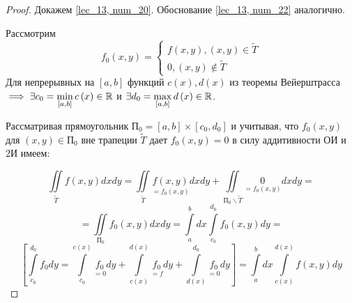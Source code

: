 \documentclass[../../main.tex]{subfiles}
\begin{document}
\begin{proof}
	Докажем \eqref {lec_13, num_20}. Обоснование \eqref {lec_13, num_22}
	аналогично.
	
	Рассмотрим 
	\[ 
	f_0 \left( x, y \right) =  
	\begin{cases}
	f \left( x, y \right),  \left( x, y \right) \in \widetilde{T} \\
	0, \left( x, y \right) \notin \widetilde{T}
	\end{cases}
	\]
	Для непрерывных на $ \left[ a, b \right] $ функций 
	$ c \left( x \right), d \left( x \right) $ из теоремы Вейерштрасса
	$ \implies \exists c_0 = 
	\min\limits_{\left[ a, b \right] } c \left( x \right) \in \mathbb{R} $ и 
	$ \exists d_0 = \max\limits_{\left[a, b \right] } d \left(x\right) \in \mathbb{R} $.
	
	Рассматривая прямоугольник $ \text{П}_0 = \left[ a, b \right] \times 
	\left[ c_0, d_0 \right]  $ и учитывая, что $ f_0 \left( x, y \right) $ для 
	$ \left( x, y \right) \in \text{П}_0 $ вне трапеции $\widetilde{T}$ дает
	$ f_0 \left( x, y \right) = 0 $ в силу аддитивности ОИ и 2И имеем:
	
	\[
	\iint\limits_{ \widetilde{T} } f \left( x, y \right) dx dy = 
	\iint\limits_{ \widetilde{T} } \underset{ = f_0 \left( x, y \right) } 
	{f \left( x, y \right)} dx dy + 
	\iint\limits_{ \text{П}_0 \smallsetminus \widetilde{T} } 
	\underset{ = f_0 \left( x, y \right) }  0 dx dy =
	\]
	\[
	= \iint\limits_{ \text{П}_0} f_0 \left( x, y \right) dx dy = 
	\int\limits_a^b dx
	\int\limits_{c_0}^{d_0} f_0 \left( x, y \right) dy = 
	\]
	\[
	\left[ \int\limits_{c_0}^{d_0} f_0 dy =
	 \int\limits_{c_0} ^ {c \left( x \right) } 
	\underset{ = 0} {f_0} dy + 
	\int\limits_{c \left( x \right) } ^ {d \left( x \right) } 
	\underset{ = f} {f_0} dy +
	 \int\limits_{d \left( x \right) } ^ {d_0} 
	\underset{ = 0} {f_0} dy \right] = 
	\int\limits_a^b dx \int\limits_{c \left( x \right) } ^
	{d \left( x \right) } f \left( x, y \right) dy
	\]
\end{proof}
\end{document}
